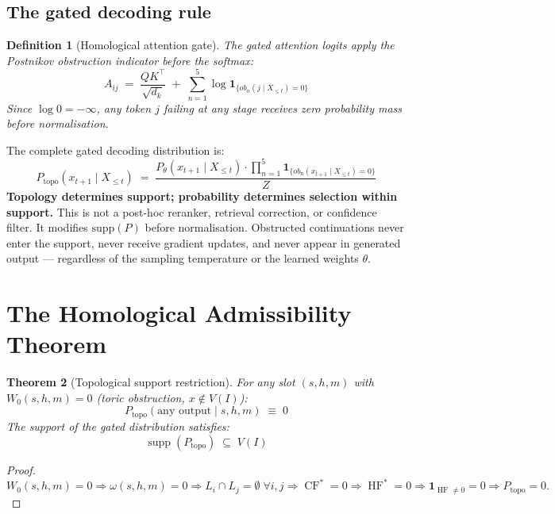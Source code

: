 \documentclass[11pt,a4paper]{article}
\newtheorem{theorem}{Theorem}[section]
\newtheorem{definition}[theorem]{Definition}
\DeclareMathOperator{\HF}{HF}
\DeclareMathOperator{\CF}{CF}
\DeclareMathOperator{\supp}{supp}
\newcommand{\one}{\mathbf{1}}
\begin{document}
\subsection{The gated decoding rule}

\begin{definition}[Homological attention gate]
The gated attention logits apply the Postnikov obstruction
indicator before the softmax:
\[
  A_{ij} \;=\; \frac{QK^\top}{\sqrt{d_k}} \;+\;
  \sum_{n=1}^{5}\log\mathbf{1}_{\{ob_n(j\mid X_{\leq t})=0\}}
\]
Since $\log 0 = -\infty$, any token $j$ failing at any stage
receives zero probability mass before normalisation.
\end{definition}

The complete gated decoding distribution is:
\[
\boxed{
  P_{\mathrm{topo}}(x_{t+1} \mid X_{\leq t})
  \;=\;
  \frac{P_\theta(x_{t+1} \mid X_{\leq t})
    \cdot\prod_{n=1}^{5}\mathbf{1}_{\{ob_n(x_{t+1}\mid X_{\leq t})=0\}}}
       {Z}
}
\]
\textbf{Topology determines support; probability determines selection
within support.}
This is not a post-hoc reranker, retrieval correction, or confidence
filter. It modifies $\mathrm{supp}(P)$ before normalisation.
Obstructed continuations never enter the support, never receive
gradient updates, and never appear in generated output ---
regardless of the sampling temperature or the learned weights $\theta$.

\section{The Homological Admissibility Theorem}

\begin{theorem}[Topological support restriction]
\label{thm:support}
For any slot $(s,h,m)$ with $W_0(s,h,m) = 0$
(toric obstruction, $x \notin V(I)$):
\[
  P_{\mathrm{topo}}(\text{any output} \mid s,h,m) \;\equiv\; 0
\]
The support of the gated distribution satisfies:
\[
  \supp(P_{\mathrm{topo}}) \;\subseteq\; V(I)
\]
\end{theorem}

\begin{proof}
$W_0(s,h,m) = 0
\Rightarrow \omega(s,h,m) = 0
\Rightarrow L_i \cap L_j = \emptyset\;\forall i,j
\Rightarrow \CF^* = 0
\Rightarrow \HF^* = 0
\Rightarrow \one_{\HF \neq 0} = 0
\Rightarrow P_{\mathrm{topo}} = 0.$
\end{proof}
\end{document}
